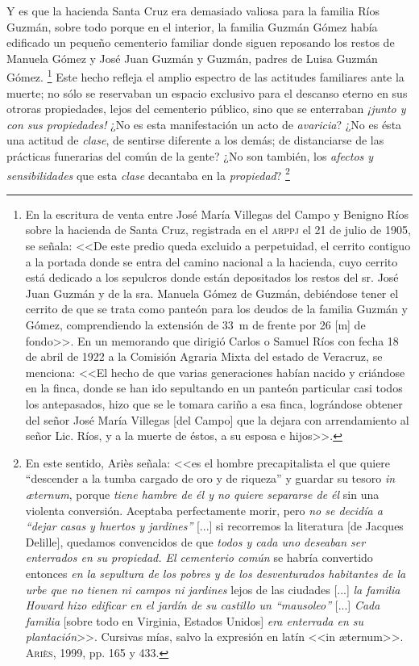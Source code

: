 \documentclass[14pt,twoside,final]{extbook} %
\let\oldfootnote\footnote
\renewcommand\footnote[1]{%
\oldfootnote{\hspace{1mm}#1}}
\begin{document}
Y es que la hacienda Santa Cruz era demasiado valiosa para la familia Ríos Guzmán, sobre todo porque en el interior, la familia Guzmán Gómez había edificado un pequeño cementerio familiar donde siguen reposando los restos de Manuela Gómez y José Juan Guzmán y Guzmán, padres de Luisa Guzmán Gómez.\footnote{En la escritura de venta entre José María Villegas del Campo y Benigno Ríos sobre la hacienda de Santa Cruz, registrada en el \textsc{arppj} el 21 de julio de 1905, se señala: <<De este predio queda excluido a perpetuidad, el cerrito contiguo a la portada donde se entra del camino nacional a la hacienda, cuyo cerrito está dedicado a los sepulcros donde están depositados los restos del sr. José Juan Guzmán y de la sra. Manuela Gómez de Guzmán, debiéndose tener el cerrito de que se trata como panteón para los deudos de la familia Guzmán y Gómez, comprendiendo la extensión de 33~m de frente por 26 [m] de fondo>>. En un memorando que dirigió Carlos o Samuel Ríos con
fecha 18 de abril de 1922 a la Comisión Agraria Mixta del estado de Veracruz, se menciona: <<El hecho de que varias generaciones habían nacido y criándose en la finca, donde se han ido sepultando en un panteón particular casi todos los antepasados, hizo que se le tomara cariño a esa finca, lográndose obtener del señor José María Villegas [del Campo] que la dejara con arrendamiento al señor Lic. Ríos, y a la muerte de éstos, a su esposa e hijos>>.} Este hecho refleja el amplio espectro de las actitudes familiares ante la muerte; no sólo se reservaban un espacio exclusivo para el descanso eterno en sus otroras propiedades, lejos del cementerio público, sino que se enterraban \emph{¡junto y con sus propiedades!} ¿No es esta manifestación un acto de \emph{avaricia}? ¿No es ésta una actitud de \emph{clase}, de sentirse diferente a los demás; de distanciarse de las prácticas funerarias del común de la gente? ¿No son también, los \emph{afectos y sensibilidades} que esta \emph{clase} decantaba en la \emph{propiedad}?\footnote{En este sentido, Ariès señala: <<es el hombre precapitalista el que quiere ``descender a la tumba cargado de oro y de riqueza'' y guardar su tesoro \emph{in \ae ternum}, porque \emph{tiene hambre de él y no quiere separarse de él} sin una violenta conversión. Aceptaba perfectamente morir, pero \emph{no se decidía a ``dejar casas y huertos y jardines''} [...] si recorremos la literatura [de Jacques Delille], quedamos convencidos de que \emph{todos y cada uno deseaban ser enterrados en su propiedad. El cementerio común} se habría convertido entonces \emph{en la sepultura de los pobres y de los desventurados habitantes de la urbe que no tienen ni campos ni jardines} lejos de las ciudades [...] \emph{la familia \emph{Howard} hizo edificar en el jardín de su castillo un ``mausoleo''} [...] \emph{Cada familia} [sobre todo en
Virginia, Estados Unidos] \emph{era enterrada en su plantación}>>. Cursivas mías, salvo la
expresión en latín <<in \ae ternum>>. \textsc{Ariès}, 1999, pp. 165 y 433.}
\end{document}
